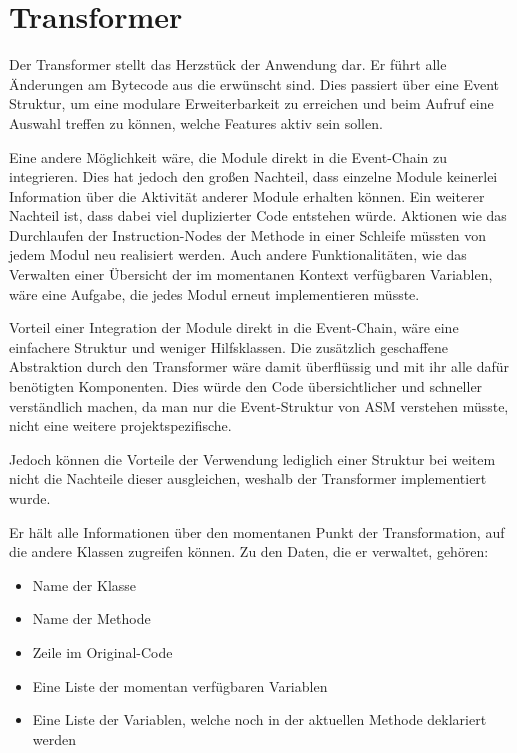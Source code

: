 \section{Transformer} 
\label{sec:trans}

Der Transformer stellt das Herzstück der Anwendung dar. Er führt alle Änderungen am Bytecode aus die erwünscht sind. Dies passiert über eine Event Struktur, um eine modulare Erweiterbarkeit zu erreichen und beim Aufruf eine Auswahl treffen zu können, welche Features aktiv sein sollen.

Eine andere Möglichkeit wäre, die Module direkt in die Event-Chain zu integrieren. Dies hat jedoch den großen Nachteil, dass einzelne Module keinerlei Information über die Aktivität anderer Module erhalten können. Ein weiterer Nachteil ist, dass dabei viel duplizierter Code entstehen würde. Aktionen wie das Durchlaufen der Instruction-Nodes der Methode in einer Schleife müssten von jedem Modul neu realisiert werden. Auch andere Funktionalitäten, wie das Verwalten einer Übersicht der im momentanen Kontext verfügbaren Variablen, wäre eine Aufgabe, die jedes Modul erneut implementieren müsste.

Vorteil einer Integration der Module direkt in die Event-Chain, wäre eine einfachere Struktur und weniger Hilfsklassen. Die zusätzlich geschaffene Abstraktion durch den Transformer wäre damit überflüssig und mit ihr alle dafür benötigten Komponenten. Dies würde den Code übersichtlicher und schneller verständlich machen, da man nur die Event-Struktur von ASM verstehen müsste, nicht eine weitere projektspezifische.

Jedoch können die Vorteile der Verwendung lediglich einer Struktur bei weitem nicht die Nachteile dieser ausgleichen, weshalb der Transformer implementiert wurde.

Er hält alle Informationen über den momentanen Punkt der Transformation, auf die andere Klassen zugreifen können. Zu den Daten, die er verwaltet, gehören:

\begin{itemize}
	\item Name der Klasse
	\item Name der Methode
	\item Zeile im Original-Code
	\item Eine Liste der momentan verfügbaren Variablen
	\item Eine Liste der Variablen, welche noch in der aktuellen Methode deklariert werden
\end{itemize}

